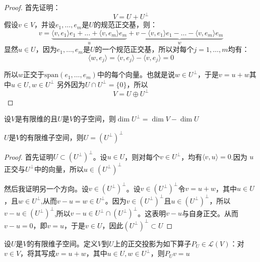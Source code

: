 \documentclass[10pt,a4paper,UTF8]{article}
\begin{document}
\begin{proof}
首先证明：
\[V = U + U^{\perp}\]
假设\(v\in V\)，并设\(e_{1},\ldots ,e_{m}\)是\(U\)的规范正交基，则：
\begin{equation}
\label{eq:2}
v = \underbrace{\langle v,e_{1} \rangle e_{1} + \ldots  + \langle v,e_{m} \rangle e_{m}}_{u} +\underbrace{ v -\langle v,e_{1} \rangle e_{1} - \ldots  - \langle v,e_{m} \rangle e_{m}}_{w}
\end{equation}
显然\(u\in U\)，因为\(e_{1},\ldots ,e_{m}\)是\(U\)的一个规范正交基，所以对每个\(j=1,\ldots ,m\)均有：
\begin{equation}
\label{eq:3}
\langle w,e_{j} \rangle  = \langle v,e_{j} \rangle  - \langle v,e_{j} \rangle = 0
\end{equation}

所以\(w\)正交于\(\mathrm{span}(e_{1},\ldots ,e_{m})\)中的每个向量。也就是说\(w\in U^{\perp}\)，于是\(v = u + w\)其中\(u\in U,w\in U^{\perp}\)
另外因为\(U\cap U^{\perp} = \{0\}\)，所以\[V= U \oplus U^{\perp}\]
\end{proof}
\begin{theorem}
设\(V\)是有限维的且\(U\)是\(V\)的子空间，则\(\dim U^{\perp} = \dim V - \dim U\)
\end{theorem}

\begin{theorem}
\(U\)是\(V\)的有限维子空间，则\(U= (U^{\perp})^{\perp}\)
\end{theorem}

\begin{proof}
首先证明\(U\subset (U^{\perp})^{\perp}\)。设\(u\in U\)，则对每个\(v\in U^{\perp}\)，均有\(\langle v,u \rangle  = 0\).因为 \(u\)正交与\(U^{\perp}\)中的向量，所以\(u\in (U^{\perp})^{\perp}\)

然后我证明另一个方向。设\(v\in (U^{\perp})^{\perp}\)。设\(v\in (U^{\perp})^{\perp}\)令\(v=u+w\)，其中\(u\in U\)，且\(w\in U^{\perp}\),从而\(v-u = w\in U^{\perp}\)。因为\(v\in (U^{\perp})^{\perp}\)且\(u\in (U^{\perp})^{\perp}\)，所以\(v-u\in (U^{\perp})^{\perp}\),所以\(v-u\in U^{\perp} \cap  (U^{\perp})^{\perp}\)。这表明\(v-u\)与自身正交。从而\(v-u=0\)，即\(v=u\)，于是\(v\in U\)，因此\((U^{\perp})^{\perp} \subset U\)
\end{proof}

\begin{definition}
设\(U\)是\(V\)的有限维子空间。定义\(V\)到\(U\)上的正交投影为如下算子\(P_{U} \in \mathcal{L}(V)\)：对\(v\in V\)，将其写成\(v= u+w\)，其中\(u\in U,w\in U^{\perp}\)，则\(P_{U}v = u\)
\end{definition}
\end{document}
